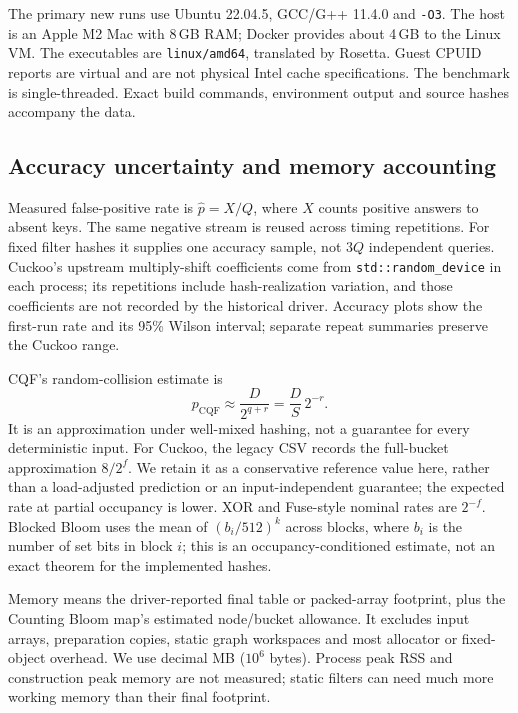 The primary new runs use Ubuntu 22.04.5, GCC/G++ 11.4.0 and \texttt{-O3}. The host is an Apple M2 Mac with 8\,GB RAM; Docker provides about 4\,GB to the Linux VM. The executables are \texttt{linux/amd64}, translated by Rosetta. Guest CPUID reports are virtual and are not physical Intel cache specifications. The benchmark is single-threaded. Exact build commands, environment output and source hashes accompany the data.

\subsection{Accuracy uncertainty and memory accounting}
Measured false-positive rate is $\hat p=X/Q$, where $X$ counts positive answers to absent keys. The same negative stream is reused across timing repetitions. For fixed filter hashes it supplies one accuracy sample, not $3Q$ independent queries. Cuckoo's upstream multiply-shift coefficients come from \texttt{std::random\_device} in each process; its repetitions include hash-realization variation, and those coefficients are not recorded by the historical driver. Accuracy plots show the first-run rate and its 95\% Wilson interval; separate repeat summaries preserve the Cuckoo range.

CQF's random-collision estimate is
\begin{equation}
p_{\mathrm{CQF}}\approx\frac{D}{2^{q+r}}=\frac{D}{S}\,2^{-r}.
\label{eq:cqf-fpr}
\end{equation}
It is an approximation under well-mixed hashing, not a guarantee for every deterministic input. For Cuckoo, the legacy CSV records the full-bucket approximation $8/2^f$. We retain it as a conservative reference value here, rather than a load-adjusted prediction or an input-independent guarantee; the expected rate at partial occupancy is lower. XOR and Fuse-style nominal rates are $2^{-f}$. Blocked Bloom uses the mean of $(b_i/512)^k$ across blocks, where $b_i$ is the number of set bits in block $i$; this is an occupancy-conditioned estimate, not an exact theorem for the implemented hashes.

Memory means the driver-reported final table or packed-array footprint, plus the Counting Bloom map's estimated node/bucket allowance. It excludes input arrays, preparation copies, static graph workspaces and most allocator or fixed-object overhead. We use decimal MB ($10^6$ bytes). Process peak RSS and construction peak memory are not measured; static filters can need much more working memory than their final footprint.
\clearpage
